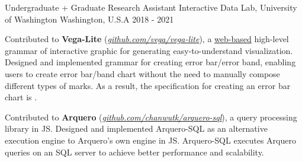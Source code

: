 \begin{cventries}
  \cvwork
    {Undergraduate + Graduate Research Assistant} %
    {Interactive Data Lab, University of Washington} %
    {Washington, U.S.A} %
    {2018 - 2021} %
    {
      \begin{cvitems} %
        \item {
          Contributed to \textbf{Vega-Lite} (\href{https://www.github.com/vega/vega-lite}{\textit{github.com/vega/vega-lite}}), a \underline{web-based} high-level grammar of interactive graphic for generating easy-to-understand visualization.
          Designed and implemented grammar for creating error bar/error band,
          enabling users to create error bar/band chart without the need to manually compose different types of marks.
          As a result, the specification for creating an error bar chart is \underline{}.
        }
        \item {
          Contributed to \textbf{Arquero} (\href{https://www.github.com/chanwutk/arquero-sql}{\textit{github.com/chanwutk/arquero-sql}}), a query processing library in JS.
          Designed and implemented Arquero-SQL as an alternative execution engine to Arquero's own engine in JS.
          Arquero-SQL executes Arquero queries on an SQL server to achieve better performance and scalability.
        }
      \end{cvitems}
    }



\end{cventries}

